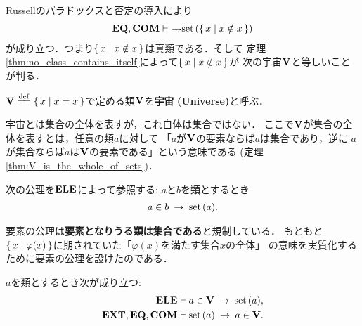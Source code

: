 	Russellのパラドックスと否定の導入により
	\begin{align}
		\mbox{{\bf EQ}},\mbox{\bf COM} \vdash\ \rightharpoondown\hspace{-0.25em} \operatorname*{set}\hspace{0.15em}(\{\, x \mid x \notin x\, \})
	\end{align}
	が成り立つ．つまり$\{\, x \mid x \notin x\, \}$は真類である．そして
	定理\ref{thm:no_class_contains_itself}によって$\{\, x \mid x \notin x\, \}$が
	次の宇宙$\mathbf{V}$と等しいことが判る．
	
	\begin{screen}
		\begin{dfn}[宇宙]
			$\Univ \defeq \Set{x}{x=x}$で定める類$\mathbf{V}$を{\bf 宇宙}
			{\bf (Universe)}と呼ぶ．
		\end{dfn}
	\end{screen}
	
	宇宙とは集合の全体を表すが，これ自体は集合ではない．
	ここで$\mathbf{V}$が集合の全体を表すとは，任意の類$a$に対して
	「$a$が$\mathbf{V}$の要素ならば$a$は集合であり，逆に
	$a$が集合ならば$a$は$\mathbf{V}$の要素である」という意味である
	(定理\ref{thm:V_is_the_whole_of_sets})．
	
	\begin{screen}
		\begin{axm}[要素]
			次の公理を$\mbox{{\bf ELE}}$によって参照する:
			$a$と$b$を類とするとき
			\begin{align}
				a \in b \hspace{0.25em}\rightarrow\hspace{0.25em} \operatorname*{set}\hspace{0.15em}(a).
			\end{align}
		\end{axm}
	\end{screen}
	
	要素の公理は{\bf 要素となりうる類は集合である}と規制している．
	もともと$\{\, x \mid \varphi(x)\, \}$に期されていた「$\varphi(x)$を満たす集合$x$の全体」
	の意味を実質化するために要素の公理を設けたのである．
	
	\begin{screen}
		\begin{thm}
		\label{thm:V_is_the_whole_of_sets}
			$a$を類とするとき次が成り立つ:
			\begin{align}
				\mbox{{\bf ELE}} &\vdash a \in \mathbf{V} \hspace{0.25em}\rightarrow\hspace{0.25em} \operatorname*{set}\hspace{0.15em}(a), \\
				\mbox{{\bf EXT}},\mbox{{\bf EQ}},\mbox{\bf COM} &\vdash \operatorname*{set}\hspace{0.15em}(a) \hspace{0.25em}\rightarrow\hspace{0.25em} a \in \mathbf{V}.
			\end{align}
		\end{thm}
	\end{screen}
	
